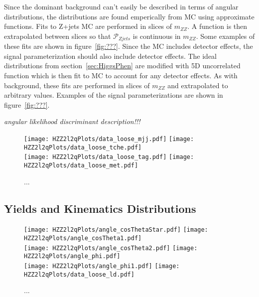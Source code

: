 Since the dominant background can't easily be described in 
terms of angular distributions, the distributions are found 
emperically from MC using approximate functions.  Fits to 
Z+jets MC are performed in slices of $m_{ZZ}$.  A function
is then extrapolated between slices so that $\mathscr{P}_{Zjets}$ 
is continuous in $m_{ZZ}$.  Some examples of these fits are shown
in figure~\ref{fig:???}.  Since the MC includes detector effects, 
the signal parameterization should also include detector effects.
The ideal distributions from section~\ref{sec:HiggsPhen} are 
modified with 5D uncorrelated function which is then fit to 
MC to account for any detector effects.  As with background, 
these fits are performed in slices of $m_{ZZ}$ and extrapolated
to arbitrary values.  Examples of the signal parameterizations
are shown in figure~\ref{fig:???}.

{\it angular likelihood discriminant description!!!}

\begin{figure}
\begin{center}
\texttt{[image: HZZ2l2qPlots/data\_loose\_mjj.pdf]}
\texttt{[image: HZZ2l2qPlots/data\_loose\_tche.pdf]}\\
\texttt{[image: HZZ2l2qPlots/data\_loose\_tag.pdf]}
\texttt{[image: HZZ2l2qPlots/data\_loose\_met.pdf]}
\label{fyn:HZZ2l2qPreselectiony}
\caption{ ... }
\end{center}
\end{figure}

\subsection{Yields and Kinematics Distributions}
\label{sec:HZZ2l2qyields}

\begin{figure}
\begin{center}
\texttt{[image: HZZ2l2qPlots/angle\_cosThetaStar.pdf]}
\texttt{[image: HZZ2l2qPlots/angle\_cosTheta1.pdf]}\\
\texttt{[image: HZZ2l2qPlots/angle\_cosTheta2.pdf]}
\texttt{[image: HZZ2l2qPlots/angle\_phi.pdf]}\\
\texttt{[image: HZZ2l2qPlots/angle\_phi1.pdf]}
\texttt{[image: HZZ2l2qPlots/data\_loose\_ld.pdf]}
\label{fyn:HZZ2l2qAngularLD}
\caption{ ... }
\end{center}
\end{figure}

